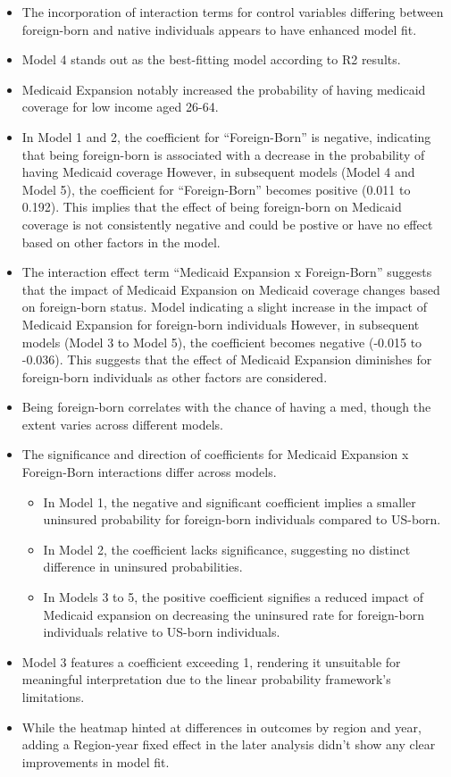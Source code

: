 \documentclass[
]{article}
\providecommand{\tightlist}{%
  \setlength{\itemsep}{0pt}\setlength{\parskip}{0pt}}
\begin{document}
\begin{itemize}
\item
  The incorporation of interaction terms for control variables differing
  between foreign-born and native individuals appears to have enhanced
  model fit.
\item
  Model 4 stands out as the best-fitting model according to R2 results.
\item
  Medicaid Expansion notably increased the probability of having
  medicaid coverage for low income aged 26-64.
\item
  In Model 1 and 2, the coefficient for ``Foreign-Born'' is negative,
  indicating that being foreign-born is associated with a decrease in
  the probability of having Medicaid coverage However, in subsequent
  models (Model 4 and Model 5), the coefficient for ``Foreign-Born''
  becomes positive (0.011 to 0.192). This implies that the effect of
  being foreign-born on Medicaid coverage is not consistently negative
  and could be postive or have no effect based on other factors in the
  model.
\item
  The interaction effect term ``Medicaid Expansion x Foreign-Born''
  suggests that the impact of Medicaid Expansion on Medicaid coverage
  changes based on foreign-born status. Model indicating a slight
  increase in the impact of Medicaid Expansion for foreign-born
  individuals However, in subsequent models (Model 3 to Model 5), the
  coefficient becomes negative (-0.015 to -0.036). This suggests that
  the effect of Medicaid Expansion diminishes for foreign-born
  individuals as other factors are considered.
\item
  Being foreign-born correlates with the chance of having a med, though
  the extent varies across different models.
\item
  The significance and direction of coefficients for Medicaid Expansion
  x Foreign-Born interactions differ across models.

  \begin{itemize}
  \tightlist
  \item
    In Model 1, the negative and significant coefficient implies a
    smaller uninsured probability for foreign-born individuals compared
    to US-born.
  \item
    In Model 2, the coefficient lacks significance, suggesting no
    distinct difference in uninsured probabilities.
  \item
    In Models 3 to 5, the positive coefficient signifies a reduced
    impact of Medicaid expansion on decreasing the uninsured rate for
    foreign-born individuals relative to US-born individuals.
  \end{itemize}
\item
  Model 3 features a coefficient exceeding 1, rendering it unsuitable
  for meaningful interpretation due to the linear probability
  framework's limitations.
\item
  While the heatmap hinted at differences in outcomes by region and
  year, adding a Region-year fixed effect in the later analysis didn't
  show any clear improvements in model fit.
\end{itemize}
\end{document}
